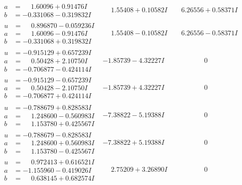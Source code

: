 \documentclass[1p]{elsarticle_modified}
\theoremstyle{definition}
\begin{document}
$$\begin{array}{c|c|c}
\begin{aligned}
a &= \phantom{-}1.60096 + 0.91476 I \\
b &= -0.331068 - 0.319832 I\end{aligned}
 & \phantom{-}1.55408 + 0.10582 I & \phantom{-}6.26556 + 0.58371 I \\ \hline\begin{aligned}
u &= \phantom{-}0.896870 - 0.059236 I \\
a &= \phantom{-}1.60096 - 0.91476 I \\
b &= -0.331068 + 0.319832 I\end{aligned}
 & \phantom{-}1.55408 - 0.10582 I & \phantom{-}6.26556 - 0.58371 I \\ \hline\begin{aligned}
u &= -0.915129 + 0.657239 I \\
a &= \phantom{-}0.50428 + 2.10750 I \\
b &= -0.706877 - 0.424114 I\end{aligned}
 & -1.85739 - 4.32227 I & \phantom{-0.000000 } 0 \\ \hline\begin{aligned}
u &= -0.915129 - 0.657239 I \\
a &= \phantom{-}0.50428 - 2.10750 I \\
b &= -0.706877 + 0.424114 I\end{aligned}
 & -1.85739 + 4.32227 I & \phantom{-0.000000 } 0 \\ \hline\begin{aligned}
u &= -0.788679 + 0.828583 I \\
a &= \phantom{-}1.248600 - 0.560983 I \\
b &= \phantom{-}1.153780 + 0.425567 I\end{aligned}
 & -7.38822 - 5.19388 I & \phantom{-0.000000 } 0 \\ \hline\begin{aligned}
u &= -0.788679 - 0.828583 I \\
a &= \phantom{-}1.248600 + 0.560983 I \\
b &= \phantom{-}1.153780 - 0.425567 I\end{aligned}
 & -7.38822 + 5.19388 I & \phantom{-0.000000 } 0 \\ \hline\begin{aligned}
u &= \phantom{-}0.972413 + 0.616521 I \\
a &= -1.155960 - 0.419026 I \\
b &= \phantom{-}0.638145 + 0.682574 I\end{aligned}
 & \phantom{-}2.75209 + 3.26890 I & \phantom{-0.000000 } 0 \\ \hline\begin{aligned}

\end{aligned}
\end{array}$$
\end{document}
